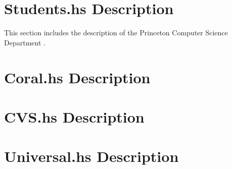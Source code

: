 \documentclass[nocopyrightspace,natbib,onecolumn,9pt]{sigplanconf}
\begin{document}
\section{Students.hs Description}
This section includes the \forest{} description of the Princeton
Computer Science Department \filestore{}.


\section{Coral.hs Description}

\section{CVS.hs Description}


\section{Universal.hs Description}

\end{document}
